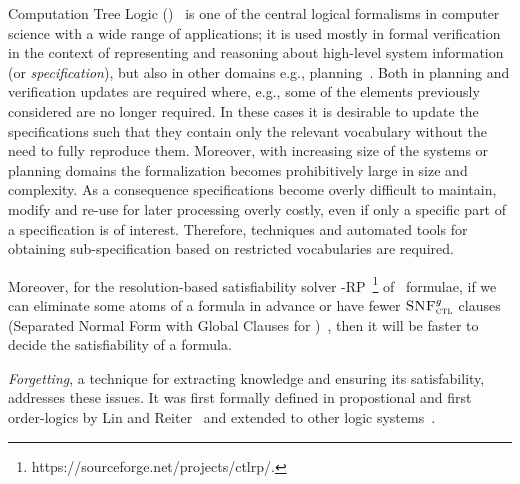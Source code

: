 \documentclass[letterpaper]{article} %
\begin{document}
\noindent Computation Tree Logic (\CTL)~\cite{clarke1981design} is one of the central logical formalisms in computer science with a wide range of applications; it is used mostly in formal verification in the context of representing and reasoning about high-level system information (or \emph{specification}), but also in other domains e.g., planning~\cite{giunchiglia1999planning,dal2002planning,akintunde2017planning}.
Both in planning and verification updates are required where, e.g., some of the elements previously considered are no longer required. In these cases it is desirable to update the specifications such that they contain only the relevant vocabulary without the need to fully reproduce them. Moreover, with increasing size of the systems or planning domains the formalization becomes prohibitively large in size and complexity. As a consequence specifications become overly difficult to maintain, modify and re-use for later processing overly costly, even if only a specific part of a specification is of interest. Therefore, techniques and automated tools for obtaining sub-specification based on restricted vocabularies are required.

Moreover, for the resolution-based satisfiability solver \CTL-RP~\footnote{https://sourceforge.net/projects/ctlrp/.} of \CTL\ formulae,  if we can eliminate some atoms of a formula in advance or  have fewer ${\textsc{SNF}_{\textsc{ctl}}^g}$ clauses (Separated Normal Form with Global Clauses for \CTL)~\cite{zhang2014resolution}, then it will be faster to decide the satisfiability of a formula. 


\emph{Forgetting}, a technique for extracting knowledge and ensuring its satisfability, addresses these issues. 
It was first formally defined
in propostional and first order-logics by Lin and Reiter~\cite{lin1994forget} and extended to other logic systems~\cite{eiter2019brief}. %
\end{document}
